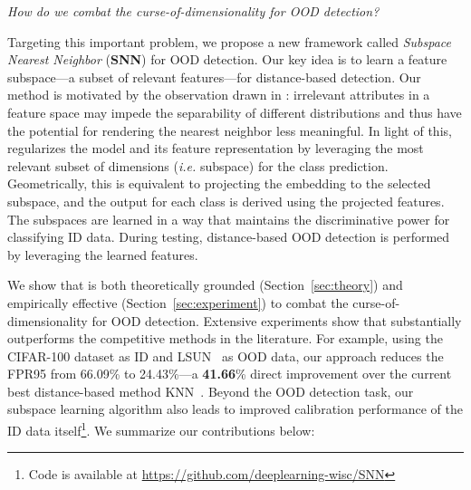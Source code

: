 \begin{center}
    \textit{How do we combat the curse-of-dimensionality for OOD detection?}
\end{center}
Targeting this important problem, we propose a new framework called \emph{Subspace Nearest Neighbor} (\textbf{SNN}) for OOD detection. Our key idea is to learn a feature subspace---a subset of relevant features---for distance-based detection. Our method is motivated by the observation drawn in \citet{houle2010can}: irrelevant attributes in a
feature space may impede the separability of different distributions and thus have the
potential for rendering the nearest neighbor less meaningful.
In light of this,
\name regularizes the model and its feature representation by leveraging the most relevant subset of dimensions (\emph{i.e.} subspace) for the class prediction. Geometrically, this is equivalent to projecting the embedding to the selected subspace, and the output for
each class is derived using the projected features. The subspaces are learned in a way that maintains the discriminative power for classifying ID data. During testing, distance-based OOD detection is performed by leveraging the learned features. 


We show that \name is both theoretically grounded (Section~\ref{sec:theory}) and empirically effective (Section~\ref{sec:experiment}) to combat the curse-of-dimensionality for OOD detection. 
Extensive experiments show that \name substantially outperforms the competitive methods in the literature.  For example,
using the CIFAR-100 dataset as ID and LSUN~\cite{yu2015lsun} as OOD data,
our approach reduces the FPR95 from {66.09}\% to {24.43}\%---a \textbf{41.66}\% direct improvement over the current best distance-based  method KNN~\cite{sun2022knn}. Beyond the OOD detection task, our subspace learning algorithm also leads to improved calibration performance of the ID data itself\footnote{Code is available at \url{https://github.com/deeplearning-wisc/SNN}}. We summarize our contributions below:

